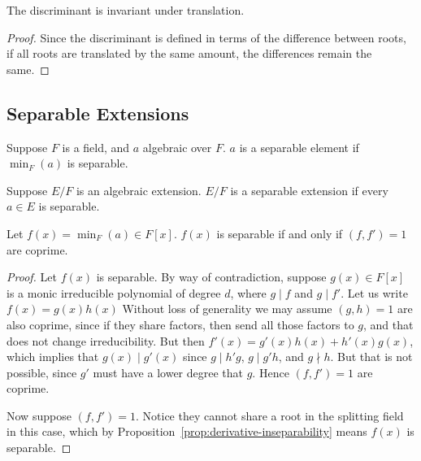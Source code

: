 \begin{proposition}
    The discriminant is invariant under translation.
\end{proposition}
\begin{proof}
    Since the discriminant is defined in terms of the difference between roots,
    if all roots are translated by the same amount,
    the differences remain the same.
\end{proof}

\subsection*{Separable Extensions}

\begin{definition}
    Suppose \(F\) is a field, and \(a\) algebraic over \(F\).
    \(a\) is a separable element if \(\min_F(a)\) is separable.
\end{definition}
\begin{definition}
    Suppose \(E/F\) is an algebraic extension.
    \(E/F\) is a separable extension if every \(a \in E\) is separable.
\end{definition}

\begin{lemma}
    Let \(f(x) = \min_F(a) \in F[x]\).
    \(f(x)\) is separable if and only if \((f,f') = 1\) are coprime.
\end{lemma}
\begin{proof}
    Let \(f(x)\) is separable.
    By way of contradiction,
    suppose \(g(x) \in F[x]\) is a monic irreducible polynomial of degree \(d\),
    where \(g \mid f\) and \(g \mid f'\).
    Let us write \(f(x) = g(x)h(x)\)
    Without loss of generality we may assume \((g,h) = 1\) are also coprime,
    since if they share factors, then send all those factors to \(g\),
    and that does not change irreducibility.
    But then \(f'(x) = g'(x)h(x) + h'(x)g(x)\),
    which implies that \(g(x) \mid g'(x)\)
    since \(g \mid h'g\), \(g \mid g'h\), and \(g \nmid h\).
    But that is not possible, since \(g'\) must have a lower degree that \(g\).
    Hence \((f,f') = 1\) are coprime.

    Now suppose \((f,f') = 1\).
    Notice they cannot share a root in the splitting field in this case,
    which by Proposition~\ref{prop:derivative-inseparability}
    means \(f(x)\) is separable.
\end{proof}

